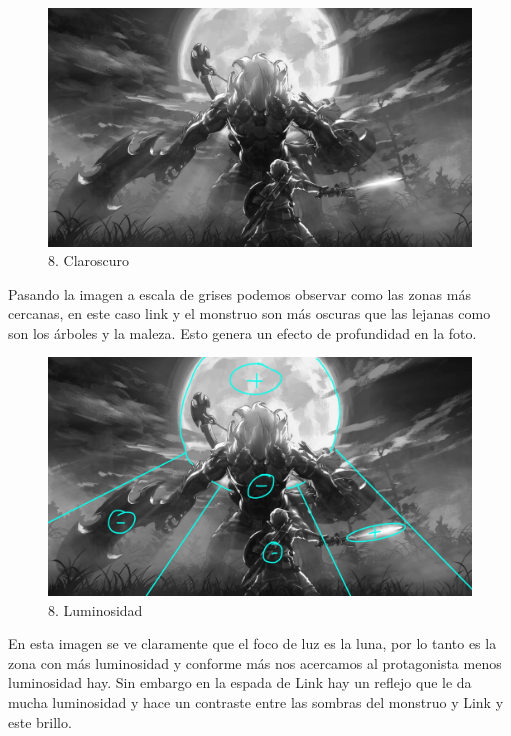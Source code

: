 \documentclass[12pt]{article}
\begin{document}
\begin{figure}[H]
      \centering
      \includegraphics[scale=0.25]{images/Raúl/Sección 8/Imagen 8 gris.jpg}
      \caption{\small 8. Claroscuro}
    \end{figure}

 Pasando la imagen a escala de grises podemos observar como las zonas más cercanas, en este caso link y el monstruo son más oscuras que las lejanas como son los árboles y la maleza. Esto genera un efecto de profundidad en la foto.

\begin{figure}[H]
      \centering
      \includegraphics[scale=0.25]{images/Raúl/Sección 8/Imagen 8 gris lumin.jpg}
      \caption{\small 8. Luminosidad}
    \end{figure}

 En esta imagen se ve claramente que el foco de luz es la luna, por lo tanto es la zona con más luminosidad y conforme más nos acercamos al protagonista menos luminosidad hay. Sin embargo en la espada de Link hay un reflejo que le da mucha luminosidad y hace un contraste entre las sombras del monstruo y Link y este brillo.
\end{document}
